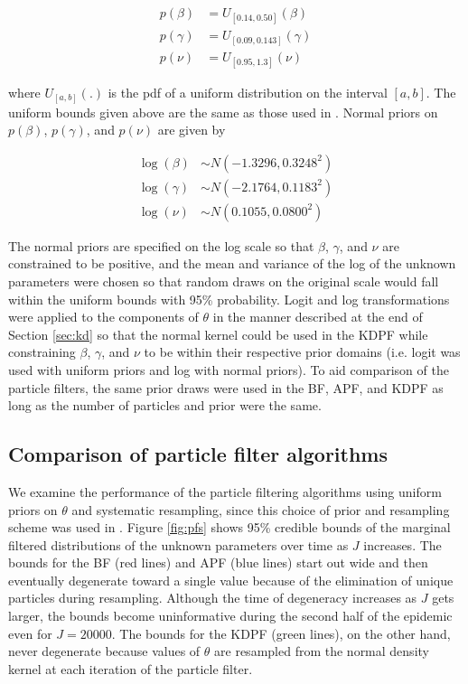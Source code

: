 \documentclass{elsarticle}
\begin{document}
\begin{align*}
p(\beta) &= U_{[0.14, 0.50]}(\beta) \\
p(\gamma) &= U_{[0.09, 0.143]}(\gamma) \\
p(\nu) &= U_{[0.95,1.3]}(\nu)
\end{align*}

\noindent where $U_{[a,b]}(.)$ is the pdf of a uniform distribution on the interval $[a,b]$.  The uniform bounds given above are the same as those used in \citet{skvortsov2012monitoring}.  Normal priors on $p(\beta)$, $p(\gamma)$, and $p(\nu)$ are given by

\begin{align*}
\log(\beta) &\sim  N(-1.3296, 0.3248^2) \\
\log(\gamma) &\sim N(-2.1764, 0.1183^2) \\
\log(\nu) &\sim N(0.1055, 0.0800^2)
\end{align*}

\noindent The normal priors are specified on the log scale so that $\beta$, $\gamma$, and $\nu$ are constrained to be positive, and the mean and variance of the log of the unknown parameters were chosen so that random draws on the original scale would fall within the uniform bounds with 95\% probability.  Logit and log transformations were applied to the components of $\theta$ in the manner described at the end of Section \ref{sec:kd} so that the normal kernel could be used in the KDPF while constraining $\beta$, $\gamma$, and $\nu$ to be within their respective prior domains (i.e. logit was used with uniform priors and log with normal priors).  To aid comparison of the particle filters, the same prior draws were used in the BF, APF, and KDPF as long as the number of particles and prior were the same.

\subsection{Comparison of particle filter algorithms} \label{sec:pfcomparison}

We examine the performance of the particle filtering algorithms using uniform priors on $\theta$ and systematic resampling, since this choice of prior and resampling scheme was used in \citet{skvortsov2012monitoring}.  Figure \ref{fig:pfs} shows 95\% credible bounds of the marginal filtered distributions of the unknown parameters over time as $J$ increases.  The bounds for the BF (red lines) and APF (blue lines) start out wide and then eventually degenerate toward a single value because of the elimination of unique particles during resampling.  Although the time of degeneracy increases as $J$ gets larger, the bounds become uninformative during the second half of the epidemic even for $J = 20000$.  The bounds for the KDPF (green lines), on the other hand, never degenerate because values of $\theta$ are resampled from the normal density kernel at each iteration of the particle filter.
\end{document}
